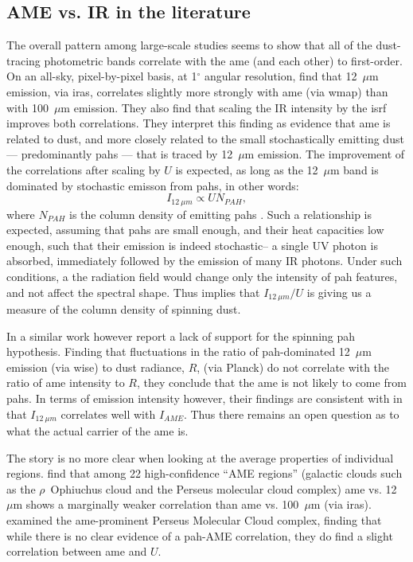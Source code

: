        \subsection{AME vs. IR in the literature}
          The overall pattern among large-scale studies seems to show that all of the dust-tracing photometric bands correlate with the \gls{ame} (and each other) to first-order.  On an all-sky, pixel-by-pixel basis, at 1$^{\circ}$ angular resolution, \cite{ysard10b} find that 12~$\mu$m emission, via \gls{iras}, correlates slightly more strongly with \gls{ame} (via \gls{wmap}) than with 100~$\mu$m emission.  They also find that scaling the IR intensity by the \gls{isrf} improves both correlations. They interpret this finding as evidence that \gls{ame} is related to dust, and more closely related to the small stochastically emitting dust --- predominantly \gls{pah}s --- that is traced by 12~$\mu$m emission. The improvement of the correlations after scaling by $U$ is expected, as long as the 12~$\mu$m band is dominated by stochastic emisson from \gls{pah}s, in other words:
            \begin{equation}
              I_{12~\mu{}m} \propto{} UN_{PAH},
            \end{equation}
          where $N_{PAH}$ is the column density of emitting \gls{pah}s \citep{onaka00}. Such a relationship is expected, assuming that \gls{pah}s are small enough, and their heat capacities low enough, such that their emission is indeed stochastic-- a single UV photon is absorbed, immediately followed by the emission of many IR photons. Under such conditions, a the radiation field would change only the intensity of \gls{pah} features, and not affect the spectral shape. Thus \cite{ysard10b} implies that $I_{12~\mu{}m}/U$ is giving us a measure of the column density of spinning dust.

          In a similar work however \cite{hensley16} report a lack of support for the spinning \gls{pah} hypothesis. Finding that fluctuations in the ratio of \gls{pah}-dominated 12~$\mu$m emission (via \gls{wise}) to dust radiance, $R$, (via Planck) do not correlate with the ratio of \gls{ame} intensity to $R$, they conclude that the \gls{ame} is not likely to come from \gls{pah}s. In terms of emission intensity however, their findings are consistent with \cite{ysard10b} in that $I_{12~\mu{}m}$ correlates well with $I_{AME}$. Thus there remains an open question as to what the actual carrier of the \gls{ame} is.

         The story is no more clear when looking at the average properties of individual regions. \cite{planckXV} find that among 22 high-confidence ``AME regions'' (galactic clouds such as the $\rho$~Ophiuchus cloud and the Perseus molecular cloud complex) \gls{ame} vs. 12~$\mu$m  shows a marginally weaker correlation than \gls{ame} vs. 100~$\mu$m (via \gls{iras}). \cite{tibbs11} examined the \gls{ame}-prominent Perseus Molecular Cloud complex, finding that while there is no clear evidence of a \gls{pah}-AME correlation, they do find a slight correlation between \gls{ame} and $U$.

